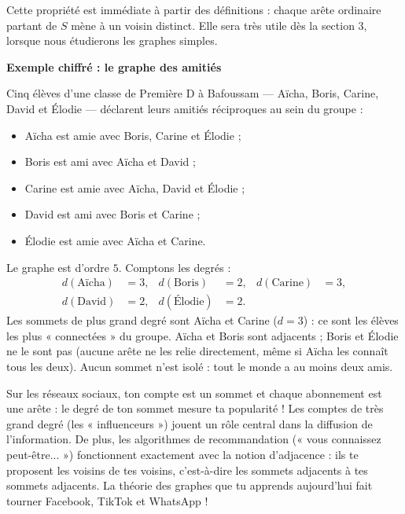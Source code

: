 \documentclass[11pt]{article}
\newcommand{\cle}[1]{{\popxbold\color{popdark}#1}}
\begin{document}
Cette propriété est immédiate à partir des définitions : chaque arête ordinaire partant de $S$ mène à un voisin distinct. Elle sera très utile dès la section 3, lorsque nous étudierons les graphes simples.

\textbf{Exemple chiffré : le graphe des amitiés}\par

\begin{exemplebox}
Cinq élèves d'une classe de Première D à Bafoussam — Aïcha, Boris, Carine, David et Élodie — déclarent leurs amitiés réciproques au sein du groupe :
\begin{itemize}
\item Aïcha est amie avec Boris, Carine et Élodie ;
\item Boris est ami avec Aïcha et David ;
\item Carine est amie avec Aïcha, David et Élodie ;
\item David est ami avec Boris et Carine ;
\item Élodie est amie avec Aïcha et Carine.
\end{itemize}
Le graphe est d'ordre $5$. Comptons les degrés :
\begin{align*}
d(\text{Aïcha}) &= 3, & d(\text{Boris}) &= 2, & d(\text{Carine}) &= 3,\\
d(\text{David}) &= 2, & d(\text{Élodie}) &= 2.
\end{align*}
Les sommets de plus grand degré sont Aïcha et Carine ($d = 3$) : ce sont les élèves les plus « connectées » du groupe. Aïcha et Boris sont adjacents ; Boris et Élodie ne le sont pas (aucune arête ne les relie directement, même si Aïcha les connaît tous les deux). Aucun sommet n'est isolé : tout le monde a au moins deux amis.
\end{exemplebox}

\begin{savaistu}
Sur les réseaux sociaux, ton compte est un sommet et chaque abonnement est une arête : le \cle{degré} de ton sommet mesure ta popularité ! Les comptes de très grand degré (les « influenceurs ») jouent un rôle central dans la diffusion de l'information. De plus, les algorithmes de recommandation (« vous connaissez peut-être... ») fonctionnent exactement avec la notion d'\cle{adjacence} : ils te proposent les voisins de tes voisins, c'est-à-dire les sommets adjacents à tes sommets adjacents. La théorie des graphes que tu apprends aujourd'hui fait tourner Facebook, TikTok et WhatsApp !
\end{savaistu}
\end{document}
